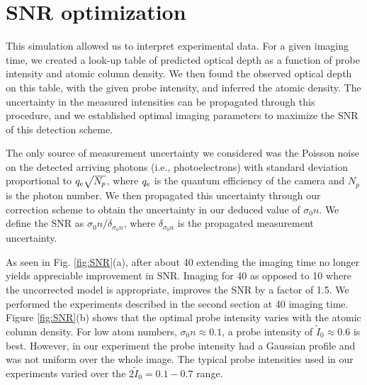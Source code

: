 \section{SNR optimization}
This simulation allowed us to interpret experimental data. For a given imaging time, we created a look-up table of predicted optical depth as a function of probe intensity and atomic column density. We then found the observed optical depth on this table, with the given probe intensity, and inferred the atomic density. The uncertainty in the measured intensities can be propagated through this procedure, and we established optimal imaging parameters to maximize the SNR of this detection scheme.
\par The only source of measurement uncertainty we considered was the Poisson noise on the detected arriving photons (i.e., photoelectrons) with standard deviation proportional to $q_{\rm{e}}\sqrt{N_p}$, where $q_{\rm{e}}$ is the quantum efficiency of the camera and $N_p$ is the photon number. We then propagated this uncertainty through our correction scheme to obtain the uncertainty in our deduced value of $\sigma_0 n$. We define the SNR as $\sigma_0 n/\delta_{\sigma_0 n}$, where $ \delta_{\sigma_0 n}$ is the propagated measurement uncertainty.
\par As seen in Fig. \ref{fig:SNR}(a), after about 40 \us{} extending the imaging time no longer yields appreciable improvement in SNR. Imaging for 40 \us{} as opposed to 10 \us{} where the uncorrected model is appropriate, improves the SNR by a factor of  1.5. We performed the experiments described in the second section at 40 \us{} imaging time. Figure \ref{fig:SNR}(b) shows that the optimal probe intensity varies with the atomic column density. For low atom numbers, $\sigma_0 n\approx0.1$, a probe intensity of $\tilde{I}_0\approx0.6$ is best. However, in our experiment the probe intensity had a Gaussian profile and was not uniform over the whole image.  The typical probe intensities used in our experiments varied over the $2\tilde{I}_0=0.1-0.7$  range.
